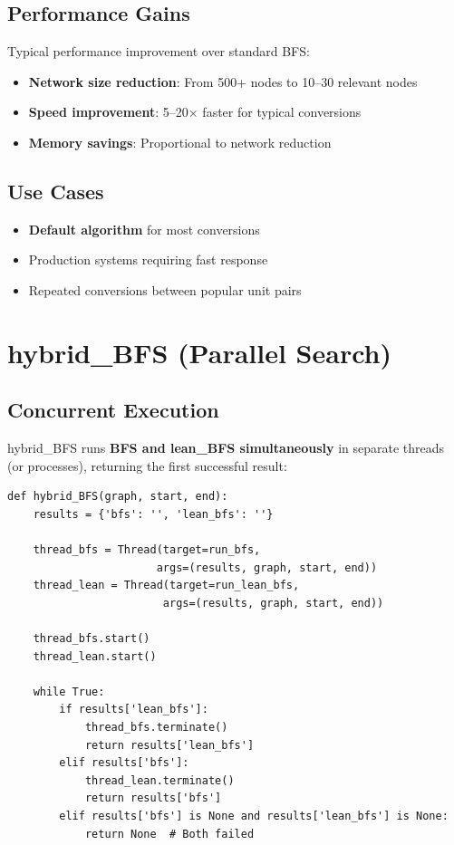 \documentclass[11pt,a4paper]{report}
\begin{document}
\subsection{Performance Gains}

Typical performance improvement over standard BFS:
\begin{itemize}[leftmargin=*]
  \item \textbf{Network size reduction}: From 500+ nodes to 10–30 relevant nodes
  \item \textbf{Speed improvement}: 5–20× faster for typical conversions
  \item \textbf{Memory savings}: Proportional to network reduction
\end{itemize}

\subsection{Use Cases}

\begin{itemize}[leftmargin=*]
  \item \textbf{Default algorithm} for most conversions
  \item Production systems requiring fast response
  \item Repeated conversions between popular unit pairs
\end{itemize}

\section{hybrid\_BFS (Parallel Search)}

\subsection{Concurrent Execution}

hybrid\_BFS runs \textbf{BFS and lean\_BFS simultaneously} in separate threads (or processes), returning the first successful result:

\begin{lstlisting}[style=pythonstyle, caption={hybrid\_BFS parallel execution}]
def hybrid_BFS(graph, start, end):
    results = {'bfs': '', 'lean_bfs': ''}
    
    thread_bfs = Thread(target=run_bfs, 
                       args=(results, graph, start, end))
    thread_lean = Thread(target=run_lean_bfs, 
                        args=(results, graph, start, end))
    
    thread_bfs.start()
    thread_lean.start()
    
    while True:
        if results['lean_bfs']:
            thread_bfs.terminate()
            return results['lean_bfs']
        elif results['bfs']:
            thread_lean.terminate()
            return results['bfs']
        elif results['bfs'] is None and results['lean_bfs'] is None:
            return None  # Both failed
\end{lstlisting}
\end{document}
